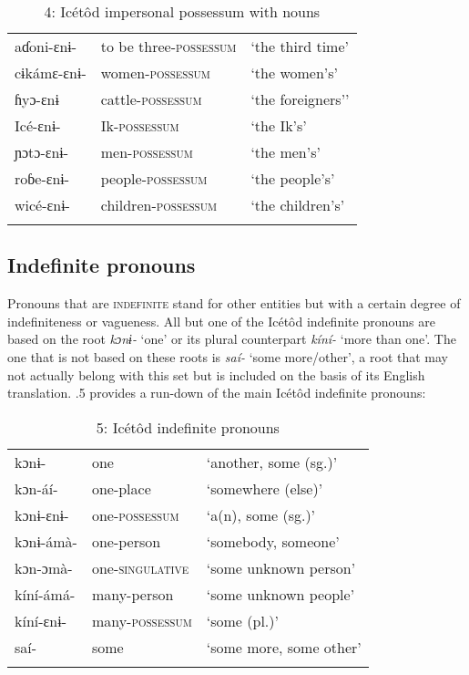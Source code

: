 \begin{table}
\caption{4: Icétôd impersonal possessum with nouns}
\label{tab:5}


\begin{tabularx}{\textwidth}{XXX}
\lsptoprule

aɗoni-ɛnɨ- & to be three-\textsc{possessum} & ‘the third time’\\
cɨkámɛ-ɛnɨ- & women-\textsc{possessum} & ‘the women’s’\\
ɦyɔ-ɛnɨ & cattle-\textsc{possessum} & ‘the foreigners’’\\
Icé-ɛnɨ- & Ik-\textsc{possessum} & ‘the Ik’s’\\
ɲɔtɔ-ɛnɨ- & men-\textsc{possessum} & ‘the men’s’\\
roɓe-ɛnɨ- & people-\textsc{possessum} & ‘the people’s’\\
wicé-ɛnɨ- & children-\textsc{possessum} & ‘the children’s’\\
\lspbottomrule
\end{tabularx}
\end{table}



\subsection{Indefinite pronouns}


Pronouns that are \textsc{indefinite} stand for other entities but with a certain degree of indefiniteness or vagueness. All but one of the Icétôd indefinite pronouns are based on the root \textit{kɔnɨ-} ‘one’ or its plural counterpart \textit{kíní-} ‘more than one’. The one that is not based on these roots is \textit{saí-} ‘some more/other’, a root that may not actually belong with this set but is included on the basis of its English translation. .5 provides a run-down of the main Icétôd indefinite pronouns:


\begin{table}
\caption{5: Icétôd indefinite pronouns}
\label{tab:5}


\begin{tabularx}{\textwidth}{XXX}
\lsptoprule

kɔnɨ- & one & ‘another, some (sg.)’\\
kɔn-áí- & one-place & ‘somewhere (else)’\\
kɔnɨ-ɛnɨ- & one-\textsc{possessum} & ‘a(n), some (sg.)’\\
kɔnɨ-ámà- & one-person & ‘somebody, someone’\\
kɔn-ɔmà- & one-\textsc{singulative} & ‘some unknown person’\\
kíní-ámá- & many-person & ‘some unknown people’\\
kíní-ɛnɨ- & many-\textsc{possessum} & ‘some (pl.)’\\
saí- & some & ‘some more, some other’\\
\lspbottomrule
\end{tabularx}
\end{table}



